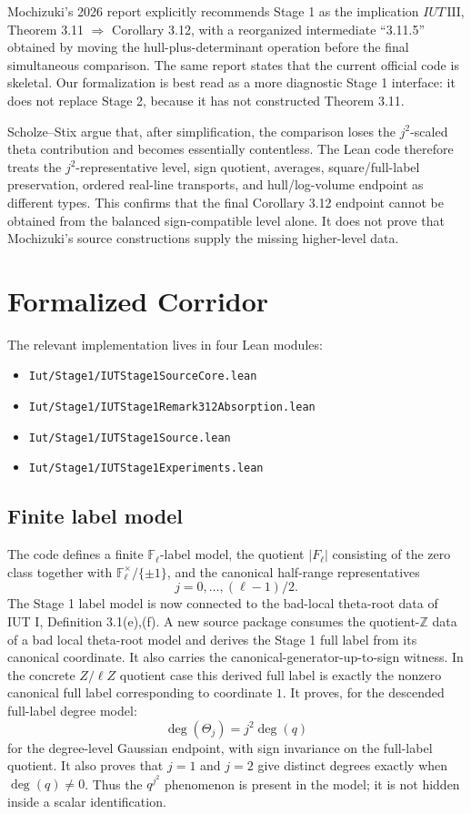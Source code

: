 \documentclass[11pt]{article}
\newcommand{\IUT}{IUT}
\newcommand{\F}{\mathbb{F}}
\theoremstyle{plain}
\theoremstyle{definition}
\theoremstyle{remark}
\begin{document}
Mochizuki's 2026 report explicitly recommends Stage 1 as the implication
\(\IUT{}\,\mathrm{III}\), Theorem 3.11 \(\Rightarrow\) Corollary 3.12, with a
reorganized intermediate ``3.11.5'' obtained by moving the hull-plus-determinant
operation before the final simultaneous comparison.  The same report states
that the current official code is skeletal.  Our formalization is best read as a
more diagnostic Stage 1 interface: it does not replace Stage 2, because it has
not constructed Theorem 3.11.

Scholze--Stix argue that, after simplification, the comparison loses the
\(j^2\)-scaled theta contribution and becomes essentially contentless.  The
Lean code therefore treats the \(j^2\)-representative level, sign quotient,
averages, square/full-label preservation, ordered real-line transports, and
hull/log-volume endpoint as different types.  This confirms that the final
Corollary 3.12 endpoint cannot be obtained from the balanced sign-compatible
level alone.  It does not prove that Mochizuki's source constructions supply the
missing higher-level data.

\section{Formalized Corridor}

The relevant implementation lives in four Lean modules:
\begin{itemize}
\item \texttt{Iut/Stage1/IUTStage1SourceCore.lean}
\item \texttt{Iut/Stage1/IUTStage1Remark312Absorption.lean}
\item \texttt{Iut/Stage1/IUTStage1Source.lean}
\item \texttt{Iut/Stage1/IUTStage1Experiments.lean}
\end{itemize}

\subsection{Finite label model}

The code defines a finite \(\F_\ell\)-label model, the quotient
\(|F_\ell|\) consisting of the zero class together with
\(\F_\ell^\times/\{\pm 1\}\), and the canonical half-range representatives
\[
  j=0,\ldots,(\ell-1)/2 .
\]
The Stage 1 label model is now connected to the bad-local theta-root data of
\IUT{} I, Definition 3.1(e),(f).  A new source package consumes the
quotient-\(\mathbb{Z}\) data of a bad local theta-root model and derives the
Stage 1 full label from its canonical coordinate.  It also carries the
canonical-generator-up-to-sign witness.  In the concrete \(Z/\ell Z\) quotient
case this derived full label is exactly the nonzero canonical full label
corresponding to coordinate \(1\).
It proves, for the descended full-label degree model:
\[
  \deg(\Theta_j)=j^2\deg(q)
\]
for the degree-level Gaussian endpoint, with sign invariance on the full-label
quotient.  It also proves that \(j=1\) and \(j=2\) give distinct degrees exactly
when \(\deg(q)\ne0\).  Thus the \(q^{j^2}\) phenomenon is present in the model;
it is not hidden inside a scalar identification.
\end{document}
